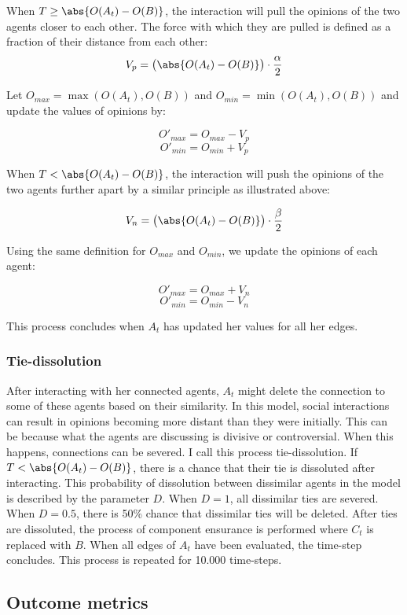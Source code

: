 \documentclass{article}
\DeclarePairedDelimiter{\abs}\lvert\rvert
\begin{document}
When $T \geq \abs{O(A_t) - O(B)}$, the interaction will pull the opinions of the two agents closer to each other. The force with which they are pulled is defined as a fraction of their distance from each other:
$$V_p = \big(\abs{O(A_t) - O(B)}\big) \cdot \frac{\alpha}{2}$$

Let $O_{max} = \max(O(A_t), O(B))$ and $O_{min} = \min(O(A_t), O(B))$ and update the values of opinions by:

$$O'_{max} = O_{max} - V_p$$
$$O'_{min} = O_{min} + V_p$$

When $T < \abs{O(A_t) - O(B)}$, the interaction will push the opinions of the two agents further apart by a similar principle as illustrated above: 

$$V_n = \big(\abs{O(A_t) - O(B)}\big) \cdot \frac{\beta}{2}$$

Using the same definition for $O_{max}$ and $O_{min}$, we update the opinions of each agent:

$$O'_{max} = O_{max} + V_n$$
$$O'_{min} = O_{min} - V_n$$

This process concludes when $A_t$ has updated her values for all her edges.

\subsubsection{Tie-dissolution}
After interacting with her connected agents, $A_t$ might delete the connection to some of these agents based on their similarity.
In this model, social interactions can result in opinions becoming more distant than they were initially. 
This can be because what the agents are discussing is divisive or controversial. When this happens, connections can be severed.
I call this process tie-dissolution. 
If $T < \abs{O(A_t) - O(B)}$, there is a chance that their tie is dissoluted after interacting. This probability of dissolution between dissimilar agents in the model is described by the parameter $D$.
When $D = 1$, all dissimilar ties are severed. When $D = 0.5$, there is 50\% chance that dissimilar ties will be deleted. 
After ties are dissoluted, the process of component ensurance is performed where $C_t$ is replaced with $B$.
When all edges of $A_t$ have been evaluated, the time-step concludes. This process is repeated for 10.000 time-steps.

\subsection{Outcome metrics} 
\end{document}
